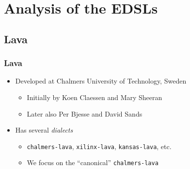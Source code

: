 \section{Analysis of the EDSLs}
\label{sec:analysis-of-the-edsls}
    \frame{\sectionpage}

    \subsection{Lava}
    \label{subsec:lava}
        \begin{frame}
            \frametitle{Lava}

            \begin{itemize}
                \item Developed at Chalmers University of Technology, Sweden
                    \begin{itemize}
                        \item Initially by Koen Claessen and Mary Sheeran
                        \item Later also Per Bjesse and David Sands
                    \end{itemize}

                \item Has several \emph{dialects}
                    \begin{itemize}
                        \item \texttt{chalmers-lava}, \texttt{xilinx-lava}, \texttt{kansas-lava}, etc. 
                        \item We focus on the ``canonical'' \texttt{chalmers-lava}
                    \end{itemize}
            \end{itemize}
        \end{frame}

